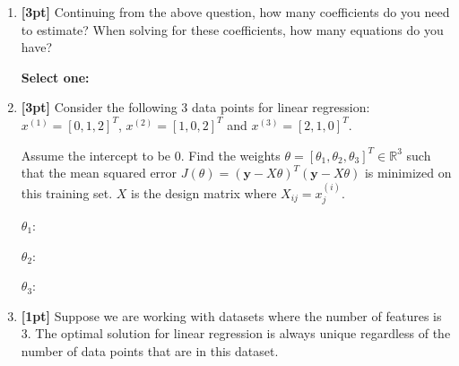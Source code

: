 \begin{enumerate}
    
    
    \clearpage
    
    \item \textbf{[3pt]} Continuing from the above question, how many coefficients do you need to estimate? When solving for these coefficients, how many equations do you have?
    
    \textbf{Select one:}
    
    
    \item \textbf{[3pt]} Consider the following 3 data points for linear regression: $x^{(1)} = [0, 1, 2]^T$, $x^{(2)} = [1, 0, 2]^T$ and $x^{(3)} = [2, 1, 0]^T$. 
    
    Assume the intercept to be 0. Find the weights $\theta = [\theta_1,  \theta_2,  \theta_3]^T \in \mathbb{R}^3$ such that the mean squared error $J(\theta) = (\textbf{y} - X\theta)^T(\textbf{y} - X\theta)$ is minimized on this training set. $X$ is the design matrix where $X_{ij} = x_j^{(i)}$. 
    
    $\theta_1$: \quad
    \begin{tcolorbox}[fit,height=1cm, width=4cm, blank, borderline={1pt}{-2pt},nobeforeafter]
    \end{tcolorbox}
    
    
    $\theta_2$: \quad
    \begin{tcolorbox}[fit,height=1cm, width=4cm, blank, borderline={1pt}{-2pt},nobeforeafter]
    \end{tcolorbox}
    
    
    $\theta_3$: \quad
    \begin{tcolorbox}[fit,height=1cm, width=4cm, blank, borderline={1pt}{-2pt},nobeforeafter]
    \end{tcolorbox}
    
    

    \item \textbf{[1pt]} Suppose we are working with datasets where the number of features is 3. The optimal solution for linear regression is always unique regardless of the number of data points that are in this dataset.
    

\end{enumerate}
